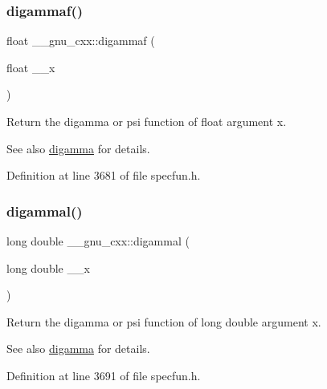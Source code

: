 \subsubsection{\texorpdfstring{digammaf()}{digammaf()}}
{\footnotesize\ttfamily float \+\_\+\+\_\+gnu\+\_\+cxx\+::digammaf (\begin{DoxyParamCaption}\item[{float}]{\+\_\+\+\_\+x }\end{DoxyParamCaption})\hspace{0.3cm}{\ttfamily [inline]}}

Return the digamma or psi function of {\ttfamily float} argument {\ttfamily x}.

\begin{DoxySeeAlso}{See also}
\hyperlink{group__mathsf__gnu_ga7b87300edf8754d959e1d94fe0c9246e}{digamma} for details. 
\end{DoxySeeAlso}


Definition at line 3681 of file specfun.\+h.

\mbox{\label{group__mathsf__gnu_gaaa1bf1503709175915cb81bcd4355ccf}} 
\subsubsection{\texorpdfstring{digammal()}{digammal()}}
{\footnotesize\ttfamily long double \+\_\+\+\_\+gnu\+\_\+cxx\+::digammal (\begin{DoxyParamCaption}\item[{long double}]{\+\_\+\+\_\+x }\end{DoxyParamCaption})\hspace{0.3cm}{\ttfamily [inline]}}

Return the digamma or psi function of {\ttfamily long double} argument {\ttfamily x}.

\begin{DoxySeeAlso}{See also}
\hyperlink{group__mathsf__gnu_ga7b87300edf8754d959e1d94fe0c9246e}{digamma} for details. 
\end{DoxySeeAlso}


Definition at line 3691 of file specfun.\+h.

\mbox{\label{group__mathsf__gnu_ga4185ee1a0f9189a18085f65d52b6bc9b}} 
